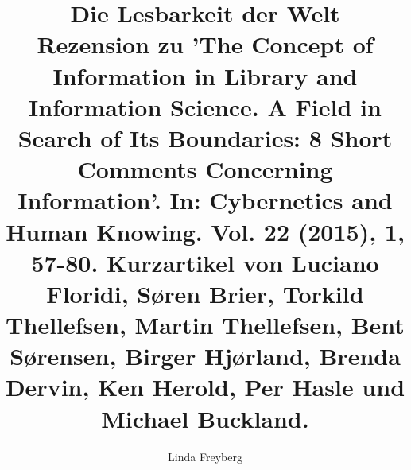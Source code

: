 
\fancyhead[R]{\thepage} %

\title{\LARGE{Die Lesbarkeit der Welt} \\ Rezension zu 'The Concept of Information in Library and Information Science. A Field in Search of Its Boundaries: 8 Short Comments Concerning Information'. In: Cybernetics and Human Knowing. Vol. 22 (2015), 1, 57-80. Kurzartikel von Luciano Floridi, Søren Brier, Torkild Thellefsen, Martin Thellefsen, Bent Sørensen, Birger Hjørland, Brenda Dervin, Ken Herold, Per Hasle und Michael Buckland.} %
\author{Linda Freyberg} %

\setcounter{page}{170}
